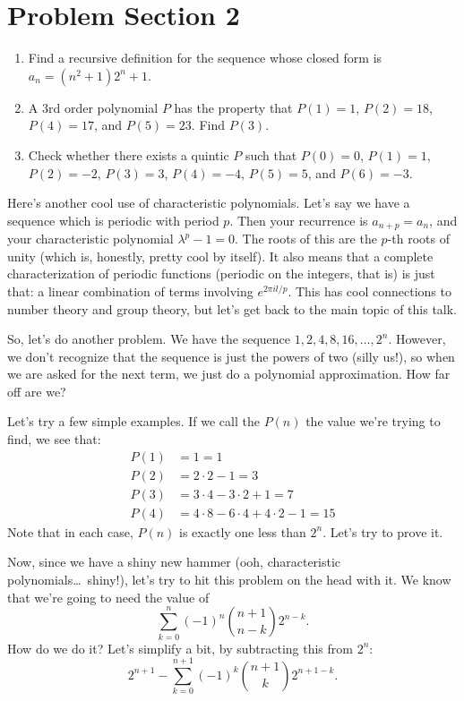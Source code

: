 \documentclass[12pt,letterpaper]{article}
\begin{document}
\section{Problem Section 2}
\begin{enumerate}
  \item Find a recursive definition for the sequence whose closed form is $a_n =
  (n^2 + 1) 2^n + 1$.
  \item A 3rd order polynomial $P$ has the property that $P(1) = 1$, $P(2) = 18$,
  $P(4) = 17$, and $P(5) = 23$. Find $P(3)$.
  \item Check whether there exists a quintic $P$ such that $P(0) = 0$, $P(1) = 1$, $P(2) = -2$,
  $P(3) = 3$, $P(4) = -4$, $P(5) = 5$, and $P(6) = -3$.
\end{enumerate}

Here's another cool use of characteristic polynomials. Let's say we have a
sequence which is periodic with period $p$. Then your recurrence is
$a_{n+p} = a_n$, and your characteristic polynomial $\lambda^p-1=0$.
The roots of this are the $p$-th roots of unity (which is, honestly,
pretty cool by itself). It also means that a complete
characterization of periodic functions (periodic on the integers, that
is) is just that: a linear combination of terms involving $e^{2\pi il/p}$. This has
cool connections to number theory and group theory, but let's get back
to the main topic of this talk.

So, let's do another problem. We have the sequence $1, 2, 4, 8, 16, \ldots, 2^n$. However,
we don't recognize that the sequence is just the powers of two (silly us!), so when we are
asked for the next term, we just do a polynomial approximation. How
far off are we?

Let's try a few simple examples. If we call the $P(n)$ the value we're trying to find, we
see that:
\begin{align*}
P(1) &= 1 = 1 \\
P(2) &= 2\cdot2-1 = 3 \\
P(3) &= 3\cdot4-3\cdot2+1 = 7 \\
P(4) &= 4\cdot8-6\cdot4+4\cdot2-1 = 15
\end{align*}
Note that in each case, $P(n)$ is exactly one less than $2^n$. Let's try to prove it.

Now, since we have a shiny new hammer (ooh, characteristic polynomials\ldots\ shiny!), let's try
to hit this problem on the head with it. We know that we're going to need the value of $$
\sum_{k=0}^{n} (-1)^n \binom{n+1}{n-k} 2^{n-k}.$$ How do we do it? Let's simplify a bit, by
subtracting this from $2^n$: $$2^{n+1} - \sum_{k=0}^{n+1} (-1)^k \binom{n+1}{k} 2^{n+1-k}.$$
\end{document}
